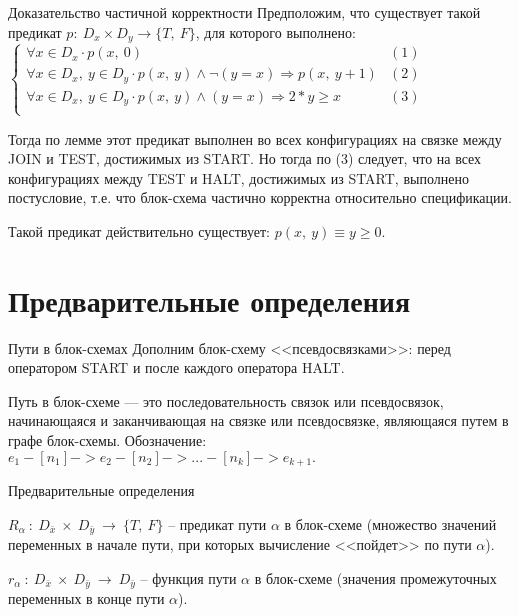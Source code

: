 \documentclass[hyperref={unicode=true}]{beamer}
\begin{document}
    \begin{frame}{Доказательство частичной корректности}
    Предположим, что существует такой предикат $p:~D_x \times D_y \rightarrow \{T,~F\}$, для которого выполнено:
    $\begin{cases}
    \forall x \in D_x \cdot p(x,~0) & (1)\\
    \forall x \in D_x,~y \in D_y \cdot p(x,~y) \land \neg (y = x) \Rightarrow p(x,~y + 1) & (2)\\
    \forall x \in D_x,~y \in D_y \cdot p(x,~y) \land (y = x) \Rightarrow 2 * y \geq x & (3) \\
     \end{cases}$

    Тогда по лемме этот предикат выполнен во всех конфигурациях на связке между JOIN и TEST, достижимых из START. Но тогда по (3) следует, что на всех конфигурациях между TEST и HALT, достижимых из START, выполнено постусловие, т.е. что блок-схема частично корректна относительно спецификации.

    Такой предикат действительно существует: $p(x,~y)\equiv y \geq 0$.
    \end{frame}

    \section{Предварительные определения}

    \begin{frame}{Пути в блок-схемах}
    Дополним блок-схему <<псевдосвязками>>: перед оператором START и после каждого оператора HALT.

    Путь в блок-схеме --- это последовательность связок или псевдосвязок, начинающаяся и заканчивающая на связке или псевдосвязке, являющаяся путем в графе блок-схемы. Обозначение: $e_1 -[n_1]-> e_2 -[n_2] -> ... -[n_k]-> e_{k+1}.$
    \end{frame}

	\begin{frame}{Предварительные определения}
	\begin{block}{}
	$R_\alpha~:~D_{\bar{x}}~\times~D_{\bar{y}}~\rightarrow~\{T,~F\}$ -- предикат
		пути $\alpha$ в блок-схеме (множество значений переменных в начале пути,
		при которых вычисление <<пойдет>> по пути $\alpha$).
	\end{block}
	\begin{block}{}
	$r_\alpha~:~D_{\bar{x}}~\times~D_{\bar{y}}~\rightarrow~D_{\bar{y}}$ -- функция
		пути $\alpha$ в блок-схеме (значения промежуточных переменных в конце пути $\alpha$).
	\end{block}
	\end{frame}
\end{document}
